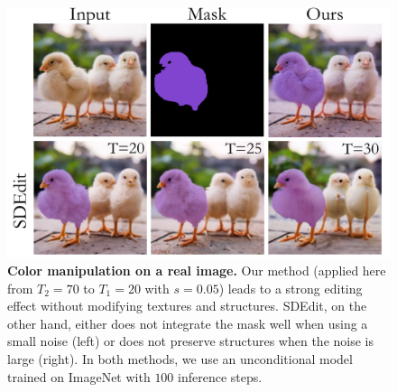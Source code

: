 
\begin{figure}
\centering
\vspace{-0.05in}
\hspace{1in}

\includegraphics[width=0.9\columnwidth]{ICCV23_submission/figures/SDEdit.pdf}
\caption{\textbf{Color manipulation on a real image.} Our method (applied here from $T_2=70$ to $T_1=20$ with $s=0.05$) leads to a strong editing effect without modifying textures and structures. SDEdit, on the other hand, either does not integrate the mask well when using a small noise (left) or does not preserve structures when the noise is large (right). In both methods, we use an unconditional model trained on ImageNet with $100$ inference steps.} 
\label{fig:mask_color}
\end{figure}




